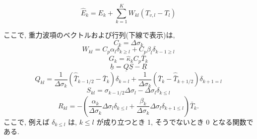 \begin{equation}
  \hat{E}_k = E_{k} 
            + \sum_{k=1}^{K} W_{kl} ( T_{v,l}-T_{l} )
\end{equation}

ここで, 重力波項のベクトルおよび行列(下線で表示)は,
%
\begin{equation}
  \label{係数C}
  C_{k} = \Delta \sigma_{k}
\end{equation}
%
\begin{equation}
  W_{kl} = C_{p} \alpha_{l} \delta_{k \geq l}
         + C_{p} \beta_{l} \delta_{k-1 \geq l}
\end{equation}
%
\begin{equation}
  G_{k} = \hat{\kappa}_{k} C_{p} \bar{T}_{k}
\end{equation}
%
\begin{equation}
\underline{h} = \underline{Q}\underline{S} - \underline{R}
\end{equation}
%
\begin{equation}
  Q_{kl} = \frac{1}{\Delta \sigma_{k}} 
             ( \hat{\bar{T}}_{k-1/2} - \bar{T}_{k} ) \delta_{k=l} 
         + \frac{1}{\Delta \sigma_{k}} 
             ( \bar{T}_{k} - \hat{\bar{T}}_{k+1/2}  ) \delta_{k+1=l} 
\end{equation}
%
\begin{equation}
  S_{kl} = \sigma_{k-1/2} \Delta \sigma_{l} 
           - \Delta \sigma_{l} \delta_{k \leq l } 
\end{equation}
%
\begin{equation}
  \label{係数R}
  R_{kl} = - \left(  \frac{ \alpha_{k} }{ \Delta \sigma_{k} } 
                     \Delta \sigma_{l} \delta_{k \leq l} 
                   + \frac{ \beta_{k} }{ \Delta \sigma_{k} } 
                     \Delta \sigma_{l} \delta_{k+1 \leq l}  
             \right) \bar{T}_{k} .
\end{equation}
%
ここで, 例えば $\delta_{k \leq l}$ は,
$ k \leq l$ が成り立つとき 1, そうでないとき 0 となる関数である.

